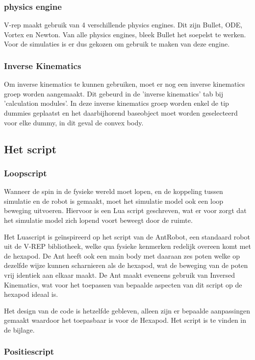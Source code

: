 \documentclass[10pt,a4paper]{article}
\begin{document}
\subsubsection{physics engine}
V-rep maakt gebruik van 4 verschillende physics engines. Dit zijn Bullet, ODE, Vortex en Newton. Van alle physics engines, bleek Bullet het soepelst te werken. Voor de simulaties is er dus gekozen om gebruik te maken van deze engine.
\subsubsection{Inverse Kinematics}
Om inverse kinematics te kunnen gebruiken, moet er nog een inverse kinematics groep worden aangemaakt. Dit gebeurd in de 'inverse kinematics' tab bij 'calculation modules'. In deze inverse kinematics groep worden enkel de tip dummies geplaatst en het daarbijhorend baseobject moet worden geselecteerd voor elke dummy, in dit geval de convex body.


\subsection{Het script}

\subsubsection{Loopscript}
Wanneer de spin in de fysieke wereld moet lopen, en de koppeling tussen simulatie en de robot is gemaakt, moet het simulatie model ook een loop beweging uitvoeren. Hiervoor is een Lua script geschreven, wat er voor zorgt dat het simulatie model zich lopend voort beweegt door de ruimte.

Het Luascript is geïnspireerd op het script van de AntRobot, een standaard robot uit de V-REP bibliotheek, welke qua fysieke kenmerken redelijk overeen komt met de hexapod. De Ant heeft ook een main body met daaraan zes poten welke op dezelfde wijze kunnen scharnieren als de hexapod, wat de beweging van de poten vrij identiek aan elkaar maakt. De Ant maakt eveneens gebruik van Inversed Kinematics, wat voor het toepassen van bepaalde aspecten van dit script op de hexapod ideaal is.

Het design van de code is hetzelfde gebleven, alleen zijn er bepaalde aanpassingen gemaakt waardoor het toepasbaar is voor de Hexapod. Het script is te vinden in de bijlage.

\subsubsection{Positiescript}
\end{document}
